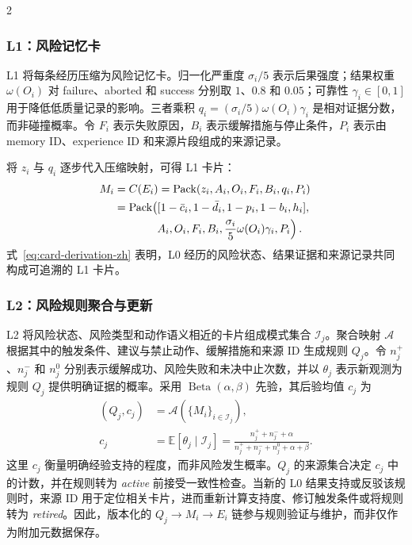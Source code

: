 \documentclass[10pt]{article}
\begin{document}
\begin{multicols}{2}
\subsubsection{L1：风险记忆卡}

L1 将每条经历压缩为风险记忆卡。归一化严重度 $\sigma_i/5$ 表示后果强度；结果权重 $\omega(O_i)$ 对 failure、aborted 和 success 分别取 $1$、$0.8$ 和 $0.05$；可靠性 $\gamma_i\in[0,1]$ 用于降低低质量记录的影响。三者乘积 $q_i=(\sigma_i/5)\omega(O_i)\gamma_i$ 是相对证据分数，而非碰撞概率。令 $F_i$ 表示失败原因，$B_i$ 表示缓解措施与停止条件，$P_i$ 表示由 memory ID、experience ID 和来源片段组成的来源记录。

将 $z_i$ 与 $q_i$ 逐步代入压缩映射，可得 L1 卡片：
\begin{equation}
\begin{aligned}
M_i&=C(E_i)=\operatorname{Pack}(z_i,A_i,O_i,F_i,B_i,q_i,P_i)\\
&=\operatorname{Pack}\!\left([1-\bar c_i,1-\bar d_i,1-p_i,1-b_i,h_i],\right.\\
&\hspace{3.6em}\left.A_i,O_i,F_i,B_i,
\frac{\sigma_i}{5}\omega(O_i)\gamma_i,P_i\right).
\end{aligned}
\label{eq:card-derivation-zh}
\end{equation}
式~\eqref{eq:card-derivation-zh} 表明，L0 经历的风险状态、结果证据和来源记录共同构成可追溯的 L1 卡片。

\subsubsection{L2：风险规则聚合与更新}

L2 将风险状态、风险类型和动作语义相近的卡片组成模式集合 $\mathcal{I}_j$。聚合映射 $\mathcal{A}$ 根据其中的触发条件、建议与禁止动作、缓解措施和来源 ID 生成规则 $Q_j$。令 $n_j^+$、$n_j^-$ 和 $n_j^0$ 分别表示缓解成功、风险失败和未决中止次数，并以 $\theta_j$ 表示新观测为规则 $Q_j$ 提供明确证据的概率。采用 $\operatorname{Beta}(\alpha,\beta)$ 先验，其后验均值 $c_j$ 为
\begin{equation}
\begin{aligned}
(Q_j,c_j)&=\mathcal{A}(\{M_i\}_{i\in\mathcal{I}_j}),\\
c_j&=\mathbb{E}[\theta_j\mid\mathcal{I}_j]
=\frac{n_j^++n_j^-+\alpha}
{n_j^++n_j^-+n_j^0+\alpha+\beta}.
\end{aligned}
\label{eq:rule-zh}
\end{equation}
这里 $c_j$ 衡量明确经验支持的程度，而非风险发生概率。$Q_j$ 的来源集合决定 $c_j$ 中的计数，并在规则转为 \textit{active} 前接受一致性检查。当新的 L0 结果支持或反驳该规则时，来源 ID 用于定位相关卡片，进而重新计算支持度、修订触发条件或将规则转为 \textit{retired}。因此，版本化的 $Q_j\rightarrow M_i\rightarrow E_i$ 链参与规则验证与维护，而非仅作为附加元数据保存。


\end{multicols}
\end{document}
